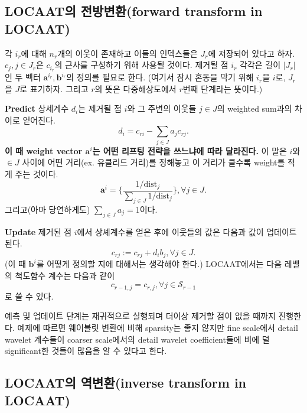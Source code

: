 \documentclass[b5paper,]{scrbook}
\theoremstyle{plain}
\theoremstyle{definition}
\numberwithin{equation}{section}
\begin{document}
\hypertarget{locaat-forward-transform-in-locaat}{%
\subsection{LOCAAT의 전방변환(forward transform in LOCAAT)}\label{locaat-forward-transform-in-locaat}}

각 \(i_{r}\)에 대해 \(n_{r}\)개의 이웃이 존재하고 이들의 인덱스들은 \(J_{r}\)에 저장되어 있다고 하자. \(c_{j}, j\in J_{r}\)은 \(c_{i_{r}}\)의 근사를 구성하기 위해 사용될 것이다. 제거될 점 \(i_{r}\) 각각은 길이 \(|J_{r}|\)인 두 벡터 \(\mathbf{a}^{i_{r}}, \mathbf{b}^{i_{r}}\)의 정의를 필요로 한다. (여기서 잠시 혼동을 막기 위해 \(i_{r}\)을 \(i\)로, \(J_{r}\)을 \(J\)로 표기하자. 그리고 \(r\)의 뜻은 다중해상도에서 \(r\)번째 단계라는 뜻이다.)

\textbf{Predict} 상세계수 \(d_{i}\)는 제거될 점 \(i\)와 그 주변의 이웃들 \(j\in J\)의 weighted sum과의 차이로 얻어진다.
\begin{equation}
d_{i}=c_{ri}-\sum_{j\in J}a_{j}c_{rj}.
\label{eq:LOCAATforwardpre}
\end{equation}
\textbf{이 때 weight vector \(\mathbf{a}^{i}\)는 어떤 리프팅 전략을 쓰느냐에 따라 달라진다.} 이 말은 \(i\)와 \(\in J\) 사이에 어떤 거리(ex. 유클리드 거리)를 정해놓고 이 거리가 클수록 weight를 적게 주는 것이다.
\[\mathbf{a}^{i}=\{ \frac{1/\text{dist}_{j}}{\sum_{j\in J}1/\text{dist}_{j}}\}, \forall j\in J.\]
그리고(아마 당연하게도) \(\sum_{j\in J} a_{j}=1\)이다.

\textbf{Update} 제거된 점 \(i\)에서 상셰계수를 얻은 후에 이웃들의 값은 다음과 값이 업데이트된다.
\begin{equation}
c_{rj}:=c_{rj}+d_{i}b_{j},\forall j\in J.
\label{eq:LOCAATforwardup}
\end{equation}
(이 때 \(\mathbf{b}^{i}\)를 어떻게 정의할 지에 대해서는 생각해야 한다.) LOCAAT에서는 다음 레벨의 척도함수 계수는 다음과 같이
\[c_{r-1,j}=c_{r,j},\forall j \in \mathcal{S}_{r-1}\]
로 쓸 수 있다.

예측 및 업데이트 단계는 재귀적으로 실행되며 더이상 제거할 점이 없을 때까지 진행한다. 예제에 따르면 웨이블릿 변환에 비해 sparsity는 좋지 않지만 fine scale에서 detail wavelet 계수들이 coarser scale에서의 detail wavelet coefficient들에 비에 덜 significant한 것들이 많음을 알 수 있다고 한다.

\hypertarget{locaat-inverse-transform-in-locaat}{%
\subsection{LOCAAT의 역변환(inverse transform in LOCAAT)}\label{locaat-inverse-transform-in-locaat}}
\end{document}

